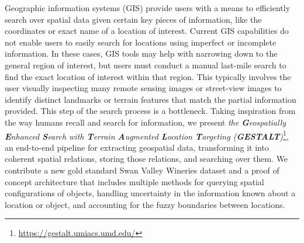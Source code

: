 

Geographic information systems (GIS) provide users with a means to efficiently search over spatial data given certain key pieces of information, like the coordinates or exact name of a location of interest. Current GIS capabilities do not enable users to easily search for locations using imperfect or incomplete information. In these cases, GIS tools may help with narrowing down to the general region of interest, but users must conduct a manual last-mile search to find the exact location of interest within that region. This typically involves the user visually inspecting many remote sensing images or street-view images to identify distinct landmarks or terrain features that match the partial information provided. This step of the search process is a bottleneck. Taking inspiration from the way humans recall and search for information, we present \textit{the \textbf{G}eospatially \textbf{E}nhanced \textbf{S}earch with \textbf{T}errain \textbf{A}ugmented \textbf{L}ocation \textbf{T}argeting (\textbf{GESTALT})}\footnote{\url{https://gestalt.umiacs.umd.edu/}}, an end-to-end pipeline for extracting geospatial data, transforming it into coherent spatial relations, storing those relations, and searching over them. We contribute a new gold standard Swan Valley Wineries dataset and a proof of concept architecture that includes multiple methods for querying spatial configurations of objects, handling uncertainty in the information known about a location or object, and accounting for the fuzzy boundaries between locations.